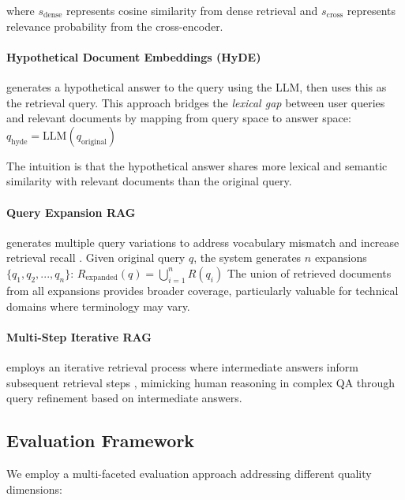 \documentclass[11pt]{article}
\begin{document}
where $s_{\text{dense}}$ represents cosine similarity from dense retrieval and 
$s_{\text{cross}}$ represents relevance probability from the cross-encoder.

\paragraph{Hypothetical Document Embeddings (HyDE)} \citep{gao2023hyde} 
generates a hypothetical answer to the query using the LLM, then uses this 
as the retrieval query. This approach bridges the \textit{lexical gap} between 
user queries and relevant documents by mapping from query space to answer space:
$q_{\text{hyde}} = \text{LLM}(q_{\text{original}})$

The intuition is that the hypothetical answer shares more lexical and semantic 
similarity with relevant documents than the original query.

\paragraph{Query Expansion RAG} generates multiple query variations to address 
vocabulary mismatch and increase retrieval recall \citep{zhuang2023query}. 
Given original query $q$, the system generates $n$ expansions $\{q_1, q_2, ..., q_n\}$:
$R_{\text{expanded}}(q) = \bigcup_{i=1}^{n} R(q_i)$ The union of retrieved 
documents from all expansions provides broader coverage, particularly valuable 
for technical domains where terminology may vary.

\paragraph{Multi-Step Iterative RAG} employs an iterative retrieval process 
where intermediate answers inform subsequent retrieval steps \citep{jiang2023retrieval},
mimicking human reasoning in complex QA through query refinement based on 
intermediate answers.

\subsection{Evaluation Framework}
We employ a multi-faceted evaluation approach addressing different quality dimensions:
\end{document}

